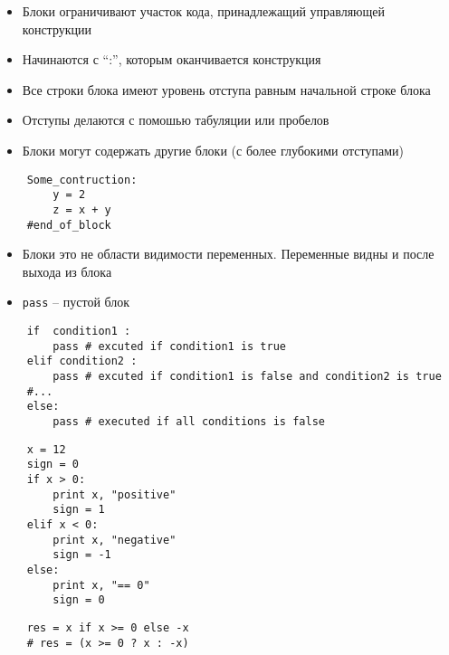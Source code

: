 \documentclass{article}
\begin{document}
\LARGE

\begin{itemize}
	\item Блоки ограничивают участок кода, принадлежащий управляющей конструкции
	\item Начинаются с “:”, которым оканчивается конструкция 
	\item Все строки блока имеют уровень отступа равным начальной строке блока
	\item Отступы делаются с помошью табуляции или пробелов
	\item Блоки могут содержать другие блоки (с более глубокими отступами)
\end{itemize}
\vspace{15pt}
\begin{lstlisting}
	Some_contruction:
		y = 2
		z = x + y
	#end_of_block
\end{lstlisting}
\newpage

\begin{itemize}
	\item Блоки это не области видимости переменных. Переменные видны и после выхода из блока
	\item \lstinline$pass$ – пустой блок
\end{itemize}
\newpage

\vspace{15pt}
\begin{lstlisting}
	if  condition1 :
	    pass # excuted if condition1 is true
	elif condition2 :
	    pass # excuted if condition1 is false and condition2 is true
	#... 
	else:
	    pass # executed if all conditions is false 
\end{lstlisting}
\newpage

\vspace{15pt}
\begin{lstlisting}
	x = 12
	sign = 0
	if x > 0:
	    print x, "positive"
	    sign = 1
	elif x < 0:
	    print x, "negative"
	    sign = -1
	else:
	    print x, "== 0"
	    sign = 0
\end{lstlisting}
\newpage

\vspace{15pt}
\begin{lstlisting}
	res = x if x >= 0 else -x
	# res = (x >= 0 ? x : -x)
\end{lstlisting}
\newpage
\end{document}
